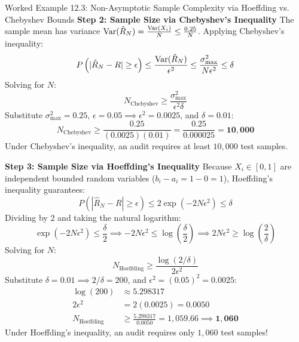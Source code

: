 \begin{examplebox}[breakable]{Worked Example 12.3: Non-Asymptotic Sample Complexity via Hoeffding vs. Chebyshev Bounds}
\textbf{Step 2: Sample Size via Chebyshev's Inequality}
The sample mean has variance $\operatorname{Var}(\hat{R}_N) = \frac{\operatorname{Var}(X_i)}{N} \le \frac{0.25}{N}$.
Applying Chebyshev's inequality:
\begin{equation}
P\left( |\hat{R}_N - R| \ge \epsilon \right) \le \frac{\operatorname{Var}(\hat{R}_N)}{\epsilon^2} \le \frac{\sigma_{\max}^2}{N \epsilon^2} \le \delta
\end{equation}
Solving for $N$:
\begin{equation}
N_{\text{Chebyshev}} \ge \frac{\sigma_{\max}^2}{\epsilon^2 \delta}
\end{equation}
Substitute $\sigma_{\max}^2 = 0.25$, $\epsilon = 0.05 \implies \epsilon^2 = 0.0025$, and $\delta = 0.01$:
\begin{equation}
N_{\text{Chebyshev}} \ge \frac{0.25}{(0.0025)(0.01)} = \frac{0.25}{0.000025} = \mathbf{10{,}000}
\end{equation}
Under Chebyshev's inequality, an audit requires at least $10{,}000$ test samples.

\textbf{Step 3: Sample Size via Hoeffding's Inequality}
Because $X_i \in [0, 1]$ are independent bounded random variables ($b_i - a_i = 1 - 0 = 1$), Hoeffding's inequality guarantees:
\begin{equation}
P\left( |\hat{R}_N - R| \ge \epsilon \right) \le 2 \exp\left( -2 N \epsilon^2 \right) \le \delta
\end{equation}
Dividing by 2 and taking the natural logarithm:
\begin{equation}
\exp\left( -2 N \epsilon^2 \right) \le \frac{\delta}{2} \implies -2 N \epsilon^2 \le \log\left(\frac{\delta}{2}\right) \implies 2 N \epsilon^2 \ge \log\left(\frac{2}{\delta}\right)
\end{equation}
Solving for $N$:
\begin{equation}
N_{\text{Hoeffding}} \ge \frac{\log(2/\delta)}{2\epsilon^2}
\end{equation}
Substitute $\delta = 0.01 \implies 2/\delta = 200$, and $\epsilon^2 = (0.05)^2 = 0.0025$:
\begin{align}
\log(200) &\approx 5.298317 \\
2\epsilon^2 &= 2(0.0025) = 0.0050 \\
N_{\text{Hoeffding}} &\ge \frac{5.298317}{0.0050} = 1{,}059.66 \implies \mathbf{1{,}060}
\end{align}
Under Hoeffding's inequality, an audit requires only $1{,}060$ test samples!


\end{examplebox}
